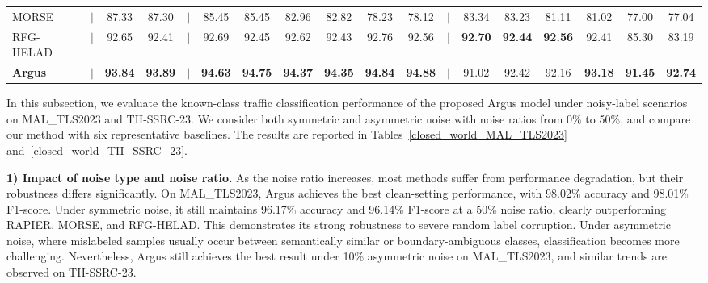 \documentclass{SCIS2026}
\begin{document}
\begin{table}[ht]
\begin{center}
\begin{threeparttable}
{\begin{tabular}{lccccccccccccccccc}
					MORSE
					& $|$
					& 87.33 & 87.30
					& $|$
					& 85.45 & 85.45
					& 82.96 & 82.82
					& 78.23 & 78.12
					& $|$
					& 83.34 & 83.23
					& 81.11 & 81.02
					& 77.00 & 77.04 \\
					
					RFG-HELAD
					& $|$
					& 92.65 & 92.41
					& $|$
					& 92.69 & 92.45
					& 92.62 & 92.43
					& 92.76 & 92.56
					& $|$
					& \textbf{92.70} & \textbf{92.44}
					& \textbf{92.56} & 92.41
					& 85.30 & 83.19 \\
					\midrule
					
					\textbf{Argus}
					& $|$
					& \textbf{93.84} & \textbf{93.89}
					& $|$
					& \textbf{94.63} & \textbf{94.75}
					& \textbf{94.37} & \textbf{94.35}
					& \textbf{94.84} & \textbf{94.88}
					& $|$
					& 91.02 & 92.42
					& 92.16 & \textbf{93.18}
					& \textbf{91.45} & \textbf{92.74} \\
					
					\bottomrule
				\end{tabular}
			}
		\end{threeparttable}
	\end{center}
	\vspace{-0.4cm}
\end{table}


In this subsection, we evaluate the known-class traffic classification performance of the proposed Argus model under noisy-label scenarios on MAL\_TLS2023 and TII-SSRC-23. We consider both symmetric and asymmetric noise with noise ratios from 0\% to 50\%, and compare our method with six representative baselines. The results are reported in Tables~\ref{closed_world_MAL_TLS2023} and~\ref{closed_world_TII_SSRC_23}.

\textbf{1) Impact of noise type and noise ratio.}
As the noise ratio increases, most methods suffer from performance degradation, but their robustness differs significantly. On MAL\_TLS2023, Argus achieves the best clean-setting performance, with 98.02\% accuracy and 98.01\% F1-score. Under symmetric noise, it still maintains 96.17\% accuracy and 96.14\% F1-score at a 50\% noise ratio, clearly outperforming RAPIER, MORSE, and RFG-HELAD. This demonstrates its strong robustness to severe random label corruption. Under asymmetric noise, where mislabeled samples usually occur between semantically similar or boundary-ambiguous classes, classification becomes more challenging. Nevertheless, Argus still achieves the best result under 10\% asymmetric noise on MAL\_TLS2023, and similar trends are observed on TII-SSRC-23.
\end{document}

